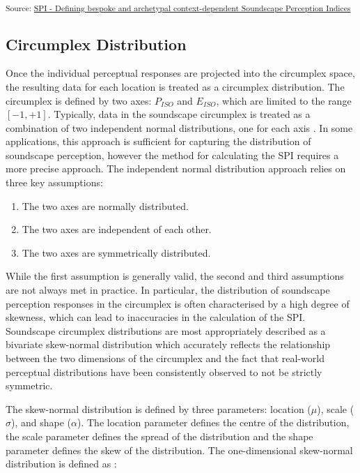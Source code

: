 \documentclass[
  authoryear,
  preprint,
  3p]{elsarticle}
\providecommand{\tightlist}{%
  \setlength{\itemsep}{0pt}\setlength{\parskip}{0pt}}\usepackage{longtable,booktabs,array}
\begin{document}
\textsubscript{Source:
\href{https://MitchellAcoustics.github.io/J2401_JASA_SSID-Single-Index/notebooks/SingleIndex-Code.ipynb.html\#cell-tbl-lang-angles}{SPI
- Defining bespoke and archetypal context-dependent Soundscape
Perception Indices}}

\subsection{Circumplex Distribution}\label{sec-circumplex-distribution}

Once the individual perceptual responses are projected into the
circumplex space, the resulting data for each location is treated as a
circumplex distribution. The circumplex is defined by two axes:
\(P_{ISO}\) and \(E_{ISO}\), which are limited to the range
\([-1, +1]\). Typically, data in the soundscape circumplex is treated as
a combination of two independent normal distributions, one for each axis
\citep{Mitchell2022How}. In some applications, this approach is
sufficient for capturing the distribution of soundscape perception,
however the method for calculating the SPI requires a more precise
approach. The independent normal distribution approach relies on three
key assumptions:

\begin{enumerate}
\def\labelenumi{\arabic{enumi}.}
\tightlist
\item
  The two axes are normally distributed.
\item
  The two axes are independent of each other.
\item
  The two axes are symmetrically distributed.
\end{enumerate}

While the first assumption is generally valid, the second and third
assumptions are not always met in practice. In particular, the
distribution of soundscape perception responses in the circumplex is
often characterised by a high degree of skewness, which can lead to
inaccuracies in the calculation of the SPI. Soundscape circumplex
distributions are most appropriately described as a bivariate
skew-normal distribution \citep{Azzalini2005Skew} which accurately
reflects the relationship between the two dimensions of the circumplex
and the fact that real-world perceptual distributions have been
consistently observed to not be strictly symmetric.

The skew-normal distribution is defined by three parameters: location
(\(\mu\)), scale (\(\sigma\)), and shape (\(\alpha\)). The location
parameter defines the centre of the distribution, the scale parameter
defines the spread of the distribution and the shape parameter defines
the skew of the distribution. The one-dimensional skew-normal
distribution is defined as \citep{Azzalini1996Multivariate}:
\end{document}
